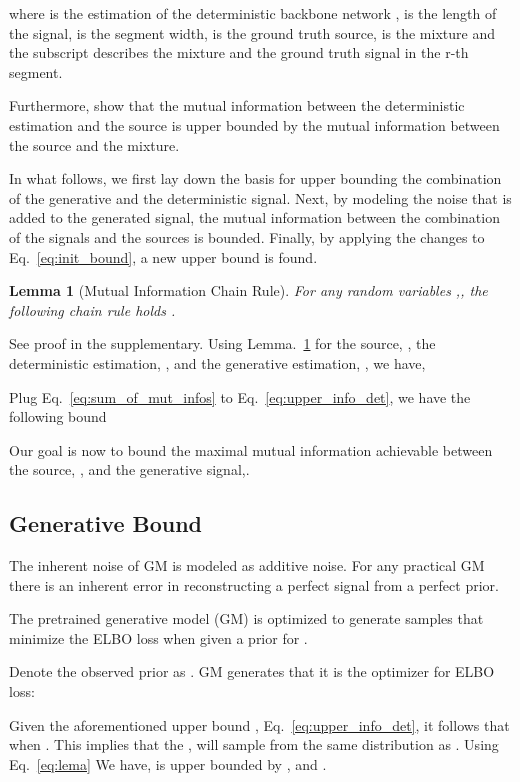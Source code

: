 \documentclass{article}
\theoremstyle{plain}
\newtheorem{lemma}[theorem]{Lemma}
\theoremstyle{definition}
\theoremstyle{remark}
\begin{document}
where  is the estimation of the deterministic backbone network ,  is the length of the signal,  is the segment width,  is the ground truth source,  is the mixture and the subscript  describes the mixture and the ground truth signal in the r-th segment.

Furthermore, \cite{sepit} show that the mutual information between the deterministic estimation and the source is upper bounded by the mutual information between the source and the mixture.


In what follows, we first lay down the basis for upper bounding the combination of the generative and the deterministic signal. Next, by modeling the noise that is added to the generated signal, the mutual information between the combination of the signals and the sources is bounded. Finally, by applying the changes to Eq.~\ref{eq:init_bound}, a new upper bound is found.

\begin{lemma}[Mutual Information Chain Rule]
For any random variables ,, the following 
chain rule holds .
\label{lemma:chain_info}
\end{lemma} See proof in the supplementary. 
Using Lemma.~\ref{lemma:chain_info} for the source, , the deterministic estimation, , and the generative estimation, , we have,

Plug Eq.~\ref{eq:sum_of_mut_infos} to Eq.~\ref{eq:upper_info_det}, we have the following bound


Our goal is now to bound the maximal mutual information achievable between the source, , and the generative signal,.
\subsection{Generative Bound}

The inherent noise of GM is modeled as additive noise. For any practical GM there is an inherent error in reconstructing a perfect signal from a perfect prior. 

The pretrained generative model (GM) is optimized to generate samples  that minimize the ELBO loss when given a prior for . 

Denote the observed prior as . GM generates  that it is the optimizer for ELBO loss:


Given the aforementioned upper bound , Eq.~\ref{eq:upper_info_det}, it follows that     
when . This implies that the , will sample from the same distribution as .
Using Eq.~\ref{eq:lema} We have,  is upper bounded by , and .
\end{document}
